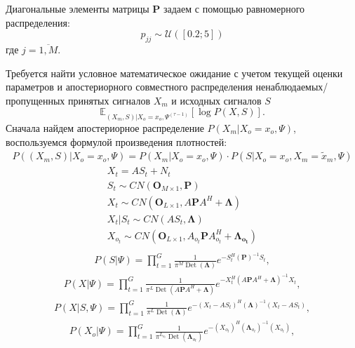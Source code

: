 \documentclass[11pt]{article}
\newcommand{\Expect}{\mathbb{E}}
\DeclareMathOperator{\Det}{Det}
\begin{document}
Диагональные элементы матрицы $\mathbf{P}$ задаем с помощью равномерного распределения:
\begin{equation}
p_{jj} \sim \mathcal{U}([0.2; 5])
\end{equation}
где $j = \overline{1,M}$.
\begin{center}
\fontsize{14}{18}\selectfont {}
\end{center}
Требуется найти условное математическое ожидание с учетом  текущей оценки параметров и апостериорного совместного распределения ненаблюдаемых/пропущенных принятых сигналов $X_m$ и исходных сигналов $S$ 
\begin{equation}
 \Expect_{(X_m,S)|X_o=x_o, \Psi^{(\tau-1)}}[\log P(X, S)].
\end{equation}
Сначала найдем апостериорное распределение $P(X_m|X_o=x_o,\Psi)$, воспользуемся формулой произведения плотностей:
\begin{gather}
P((X_m,S)|X_o=x_o,\Psi) = P(X_m|X_o = x_o, \Psi) \cdot P(S|X_o = x_o, X_m=\widetilde{x}_m, \Psi)
\end{gather}
\begin{gather*}
X_t = AS_t + N_t \\
S_t \sim CN(\mathbf{O}_{M \times 1}, \mathbf{P}) \\
X_t \sim CN(\mathbf{O}_{L \times 1}, A\mathbf{P}A^H + \mathbf{\Lambda})\\
X_t|S_t \sim CN(AS_t,  \mathbf{\Lambda})\\
X_{o_t} \sim CN(\mathbf{O}_{L \times 1}, A_{o_t}\mathbf{P}A_{o_t}^H + \mathbf{\Lambda_{o_t}})\\
\end{gather*}
\begin{gather}
P(S|\Psi) = \prod_{t=1}^G \frac{1}{\pi^M \Det(\mathbf{\Lambda})}e^{-S_t^H (\mathbf{P})^{-1}S_t},
\end{gather}
\begin{gather}
P(X|\Psi) = \prod_{t=1}^G \frac{1}{ \pi^L \Det(A\mathbf{P}A^H + \mathbf{\Lambda}) } e^{-X_t^H (A\mathbf{P}A^H + \mathbf{\Lambda})^{-1}X_t},
\end{gather}
\begin{gather}
P(X|S,\Psi) = \prod_{t=1}^G \frac{1}{\pi^L \Det(\mathbf{\Lambda}) }e^{-(X_t-AS_t)^H (\mathbf{\Lambda})^{-1}(X_t-AS_t)},
\end{gather}
\begin{gather}
P(X_o|\Psi) = \prod_{t=1}^G \frac{1}{\pi^{L_{o_t}} \Det(\mathbf{\Lambda}_{o_t})}e^{-(X_{o_t})^H (\mathbf{\Lambda}_{o_t})^{-1}(X_{o_t})},
\end{gather}
\end{document}
